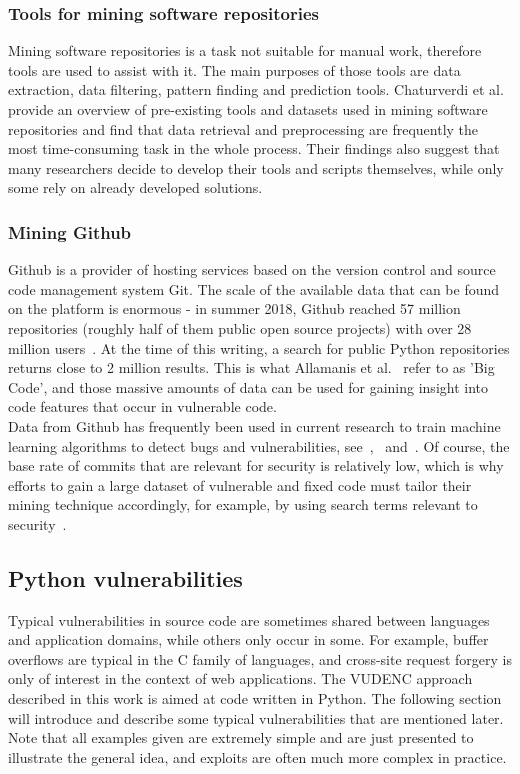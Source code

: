 \documentclass[
a4paper,
pagesize,
pdftex,
12pt,
ngerman,
fleqn,
final,
]{scrartcl}
\begin{document}
	\subsubsection{Tools for mining software repositories}
	Mining software repositories is a task not suitable for manual work, therefore tools are used to assist with it. The main purposes of those tools are data extraction, data filtering, pattern finding and prediction tools. Chaturverdi et al.~\cite{Chaturvedi.2013} provide an overview of pre-existing tools and datasets used in mining software repositories and find that data retrieval and preprocessing are frequently the most time-consuming task in the whole process. Their findings also suggest that many researchers decide to develop their tools and scripts themselves, while only some rely on already developed solutions. 
	\subsubsection{Mining Github}
	Github is a provider of hosting services based on the version control and source code management system Git. The scale of the available data that can be found on the platform is enormous - in summer 2018, Github reached 57 million repositories (roughly half of them public open source projects) with over 28 million users~\cite{Github.com.b}. At the time of this writing, a search for public Python repositories returns close to 2 million results. This is what Allamanis et al.~\cite{Allamanis.2018} refer to as 'Big Code', and those massive amounts of data can be used for gaining insight into code features that occur in vulnerable code.\\
	Data from Github has frequently been used in current research to train machine learning algorithms to detect bugs and vulnerabilities, see~\cite{Zhou.2017},~\cite{Russell.2018} and~\cite{Liu.2018}. Of course, the base rate of commits that are relevant for security is relatively low, which is why efforts to gain a large dataset of vulnerable and fixed code must tailor their mining technique accordingly, for example, by using search terms relevant to security~\cite{Zhou.2017}.
	
	\subsection{Python vulnerabilities}
	
	Typical vulnerabilities in source code are sometimes shared between languages and application domains, while others only occur in some. For example, buffer overflows are typical in the C family of languages, and cross-site request forgery is only of interest in the context of web applications. The VUDENC approach described in this work is aimed at code written in Python. The following section will introduce and describe some typical vulnerabilities that are mentioned later. Note that all examples given are extremely simple and are just presented to illustrate the general idea, and exploits are often much more complex in practice.
	
\end{document}
